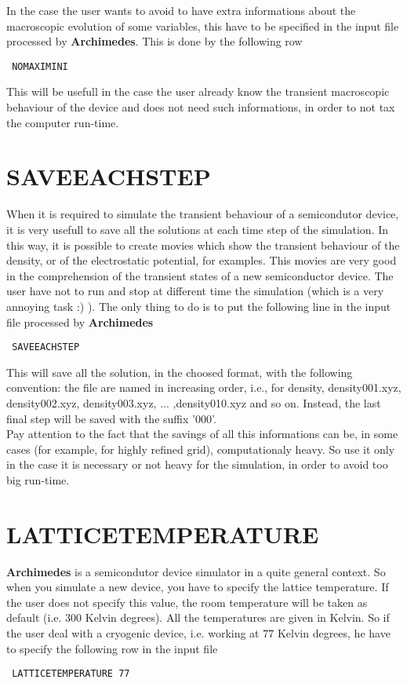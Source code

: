 \documentclass[12pt]{book}
\begin{document}
In the case the user wants to avoid to have extra informations about the macroscopic evolution of some variables, this have to be specified in the input file processed by \textbf{Archimedes}. This is done by the following row
\begin{verbatim}
 NOMAXIMINI
\end{verbatim}
This will be usefull in the case the user already know the transient macroscopic behaviour of the device and does not need such informations, in order to not tax the computer run-time.

\section{SAVEEACHSTEP}

When it is required to simulate the transient behaviour of a semicondutor device, it is very usefull to save all the solutions at each time step of the simulation. In this way, it is possible to create movies which show the transient behaviour of the density, or of the electrostatic potential, for examples. This movies are very good in the comprehension of the transient states of a new semiconductor device. The user have not to run and stop at different time the simulation (which is a very annoying task :) ). The only thing to do is to put the following line in the input file processed by \textbf{Archimedes}
\begin{verbatim}
 SAVEEACHSTEP
\end{verbatim}
This will save all the solution, in the choosed format, with the following convention: the file are named in increasing order, i.e., for density, density001.xyz, density002.xyz, density003.xyz, ... ,density010.xyz and so on. Instead, the last final step will be saved with the suffix '000'.
\\
Pay attention to the fact that the savings of all this informations can be, in some cases (for example, for highly refined grid), computationaly heavy. So use it only in the case it is necessary or not heavy for the simulation, in order to avoid too big run-time.

\section{LATTICETEMPERATURE}

\textbf{Archimedes} is a semicondutor device simulator in a quite general context. So when you simulate a new device, you have to specify the lattice temperature. If the user does not specify this value, the room temperature will be taken as default (i.e. $300$ Kelvin degrees). All the temperatures are given in Kelvin. So if the user deal with a cryogenic device, i.e. working at $77$ Kelvin degrees, he have to specify the following row in the input file
\begin{verbatim}
 LATTICETEMPERATURE 77
\end{verbatim}
\end{document}
